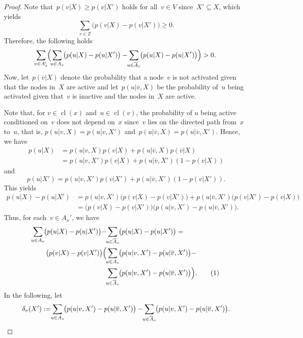 \documentclass{article}
\DeclareMathOperator{\cl}{cl}
\begin{document}
\begin{proof}
  Note that~$p(v|X)\ge p(v|X')$ holds for all~$v\in V$
  since~$X'\subseteq X$, which yields
  \[\sum_{v\in Z}\big(p(v|X)-p(v|X')\big) \ge 0.\]
  Therefore, the following holds
  \begin{align}
    \smashoperator{\sum_{v\in A_x'}}\Big(\smashoperator{\sum_{u \in A_v}}\big(p(u|X)-p(u|X')\big)-\smashoperator{\sum_{u \in \overline{A}_v}}\big(p(u|X) - p(u|X')\big)\Big) > 0.\label{eq:C'-C3}
  \end{align}
  Now, let~$p(\overline{v}|X)$ denote the probability that a
  node~$v$ is not activated given that the nodes in~$X$ are active
  and let~$p(u|\overline{v},X)$ be the probability
  of~$u$ being activated given that~$v$ is inactive
  and the nodes in~$X$ are active.

  Note that, for $v\in \cl(x)$ and~$u\in\cl(v)$,
  the probability of $u$ being active conditioned on~$v$ does
  not depend on~$x$ since~$v$ lies on the directed path from~$x$
  to~$u$, that is, $p(u|v,X) = p(u|v,X')$ and~$p(u|\overline{v},X) =
  p(u|\overline{v},X')$.
  Hence, we have
  \begin{align*}
    p(u|X)&=p(u|v,X)p(v|X)+p(u|\overline{v},X)p(\overline{v}|X)\\
          &=p(u|v,X')p(v|X)+p(u|\overline{v},X')(1-p(v|X))
  \end{align*}
  and
  \[
    p(u|X')=p(u|v,X')p(v|X')+p(u|\overline{v},X')(1-p(v|X')).
  \]
  This yields
  \begin{align*}
    p(u|X)-p(u|X')&=p(u|v,X')\big(p(v|X)-p(v|X')\big) +
                  p(u|\overline{v},X')\big(p(v|X')-p(v|X)\big)\\
                  &=\big(p(v|X)-p(v|X')\big)\big(p(u|v,X')-p(u|\overline{v},X')\big).
  \end{align*}
  Thus, for each~$v\in A_x'$, we have 
  \begin{align*}
    \smashoperator{\sum_{u \in A_v}}\big(p(u|X)-p(u|X')\big)-&\smashoperator{\sum_{u \in
    \overline{A}_v}}\big(p(u|X) - p(u|X')\big)=\\
    \big(p(v|X)-p(v|X')\big)\Big(&\smashoperator{\sum_{u \in
        A_v}}\big(p(u|v,X')-p(u|\overline{v},X')\big) -\\
    &\smashoperator{\sum_{u \in
        \overline{A}_v}}\big(p(u|v,X')-p(u|\overline{v},X')\big)\Big).\stepcounter{equation}\tag{\theequation}\label{eq:inner-prod}
  \end{align*}
  In the following, let
  \[\delta_v(X'):=\smashoperator{\sum_{u \in A_v}}
     \big(p(u|v,X')-p(u|\overline{v},X')\big) -
     \smashoperator{\sum_{u \in \overline{A}_v}}\big(p(u|v,X')-p(u|\overline{v},X')\big).\]
  

\end{proof}
\end{document}
